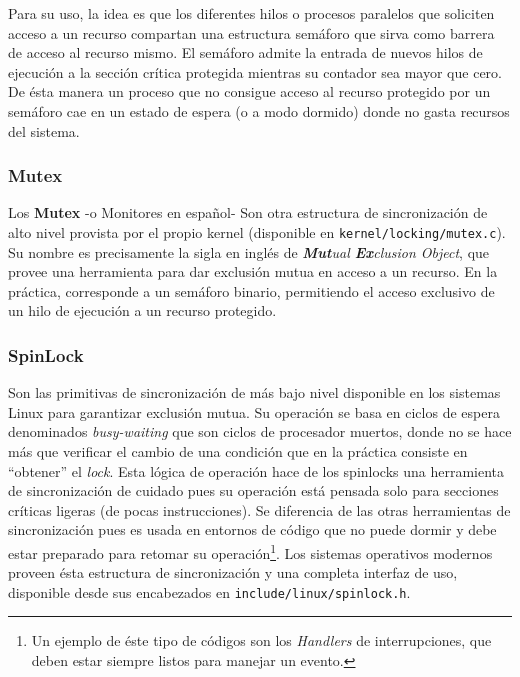 Para su uso, la idea es que los diferentes hilos o procesos paralelos que soliciten acceso a un recurso compartan una estructura semáforo que sirva como barrera de acceso al recurso mismo. El semáforo admite la entrada de nuevos hilos de ejecución a la sección crítica protegida mientras su contador sea mayor que cero. De ésta manera un proceso que no consigue acceso al recurso protegido por un semáforo cae en un estado de espera (o a modo dormido) donde no gasta recursos del sistema.

\subsubsection{Mutex}
Los \textbf{Mutex} -o Monitores en español- Son otra estructura de sincronización de alto nivel provista por el propio kernel (disponible en \verb=kernel/locking/mutex.c=). Su nombre es precisamente la sigla en inglés de \emph{\textbf{Mut}ual \textbf{Ex}clusion Object}, que provee una herramienta para dar exclusión mutua en acceso a un recurso. En la práctica, corresponde a un semáforo binario, permitiendo el acceso exclusivo de un hilo de ejecución a un recurso protegido.

\subsubsection{SpinLock}
Son las primitivas de sincronización de más bajo nivel disponible en los sistemas Linux para garantizar exclusión mutua. Su operación se basa en ciclos de espera denominados \emph{busy-waiting} que son ciclos de procesador muertos, donde no se hace más que verificar el cambio de una condición que en la práctica consiste en ``obtener'' el \emph{lock}. Esta lógica de operación hace de los spinlocks una herramienta de sincronización de cuidado pues su operación está pensada solo para secciones críticas ligeras (de pocas instrucciones). Se diferencia de las otras herramientas de sincronización pues es usada en entornos de código que no puede dormir y debe estar preparado para retomar su operación\footnote{Un ejemplo de éste tipo de códigos son los \textit{Handlers} de interrupciones, que deben estar siempre listos para manejar un evento.}. Los sistemas operativos modernos proveen ésta estructura de sincronización y una completa interfaz de uso, disponible desde sus encabezados en \verb=include/linux/spinlock.h=.

